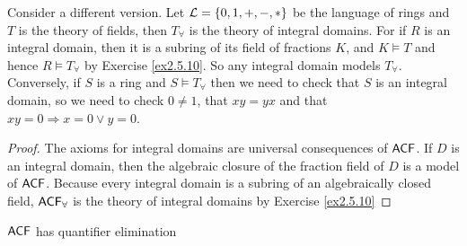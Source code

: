 \documentclass[11pt]{article}
\begin{document}
Consider a different version. Let \(\mathcal{L}=\{0,1,+,-,*\}\) be the language of rings and \(T\) is the
theory of fields, then \(T_\forall\) is the theory of integral domains. For if \(R\) is an integral
domain, then it is a subring of its field of fractions \(K\), and \(K\vDash T\) and hence \(R\vDash T_\forall\)
by Exercise \ref{ex2.5.10}. So any integral domain models \(T_\forall\). Conversely, if \(S\) is a ring
and \(S\vDash T_\forall\) then we need to check that \(S\) is an integral domain, so we need to
check \(0\neq 1\), that \(xy=yx\) and that \(xy=0\Rightarrow x=0\vee y=0\).


\begin{proof}
The axioms for integral domains are universal consequences of \(\textsf{ACF}\). If \(D\)
is an integral domain, then the algebraic closure of the fraction field of
\(D\) is a model of \(\textsf{ACF}\). Because every integral domain is a subring of an
algebraically closed field, \(\textsf{ACF}_\forall\) is the theory of integral
domains by Exercise \ref{ex2.5.10}
\end{proof}

\begin{theorem}[]
\label{thm3.2.2}
\(\textsf{ACF}\) has quantifier elimination
\end{theorem}
\end{document}
